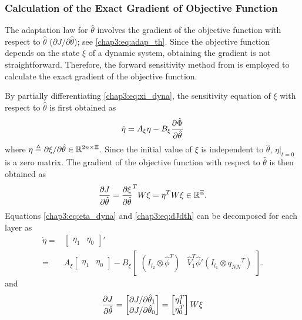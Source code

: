 \subsubsection{Calculation of the Exact Gradient of Objective Function}

The adaptation law for $\hat\theta$ involves the gradient of the objective function with respect to $\hat\theta$ (\ie ${\partial J/\partial \hat\theta}$); see \eqref{chap3:eq:adap_th}. Since the objective function depends on the state $\xi$ of a dynamic system, obtaining the gradient is not straightforward. Therefore, the forward sensitivity method from \cite{RN49} is employed to calculate the exact gradient of the objective function. 

By partially differentiating \eqref{chap3:eq:xi_dyna}, the sensitivity equation of $\xi$ with respect to $\hat\theta$ is first obtained as
\begin{equation}
    \dot\eta = A_\xi\eta - B_\xi{\partial\hat\Phi\over\partial\hat\theta}
    \label{chap3:eq:eta_dyna}
\end{equation}
where $\eta \triangleq \partial \xi/\partial \hat\theta\in\mathbb{R}^{2n\times \Xi}$.
Since the initial value of $\xi$ is independent to $\hat\theta$, $\eta|_{t=0}$ is a zero matrix. The gradient of the objective function with respect to $\hat\theta$ is then obtained as 
\begin{equation}
   {\partial J\over\partial \hat\theta} =  {\partial \xi\over \partial \hat\theta}^T  W\xi=\eta^T  W\xi\in\mathbb{R}^\Xi.
   \label{chap3:eq:dJdth}
\end{equation}
Equations \eqref{chap3:eq:eta_dyna} and \eqref{chap3:eq:dJdth} can be decomposed for each layer as 
\begin{equation}
  \begin{aligned}
    \dot\eta =&
    \begin{bmatrix}
        \eta_1&\eta_0
    \end{bmatrix}'
    \\
    =&A_\xi
    \begin{bmatrix}
        \eta_1&\eta_0
    \end{bmatrix}
    -B_\xi
    \begin{bmatrix}
        (I_{l_2}\otimes \hat\phi^T)&\hat V_1^T\hat\phi'(I_{l_1}\otimes {q_{NN}}^T)
    \end{bmatrix}
    .
  \end{aligned}
  \label{chap3:eq:eta_dyna_decomp}
\end{equation}
and
\begin{equation}
    {\partial J\over\partial\hat\theta}
    =
    \begin{bmatrix}
        \partial J/\partial\hat\theta_1\\\partial J/\partial\hat\theta_0\\
    \end{bmatrix}    =
    \begin{bmatrix}
        \eta_1^T\\\eta_0^T\\
    \end{bmatrix}
    W
    \xi
\end{equation}
